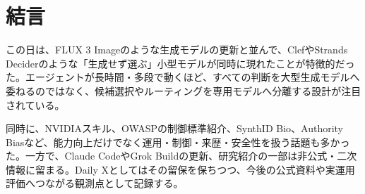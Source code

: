 \section*{結言}
この日は、FLUX 3 Imageのような生成モデルの更新と並んで、ClefやStrands Deciderのような「生成せず選ぶ」小型モデルが同時に現れたことが特徴的だった。エージェントが長時間・多段で動くほど、すべての判断を大型生成モデルへ委ねるのではなく、候補選択やルーティングを専用モデルへ分離する設計が注目されている。

同時に、NVIDIAスキル、OWASPの制御標準紹介、SynthID Bio、Authority Biasなど、能力向上だけでなく運用・制御・来歴・安全性を扱う話題も多かった。一方で、Claude CodeやGrok Buildの更新、研究紹介の一部は非公式・二次情報に留まる。Daily Xとしてはその留保を保ちつつ、今後の公式資料や実運用評価へつながる観測点として記録する。
